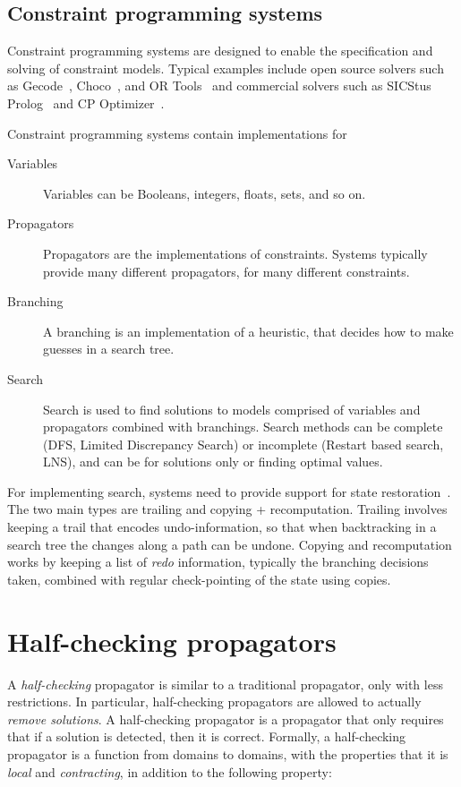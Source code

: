 \documentclass[runningheads]{llncs}
\begin{document}
\subsection{Constraint programming systems}
\label{sec:cp:systems}

Constraint programming systems are designed to enable the
specification and solving of constraint models.  Typical examples
include open source solvers such as Gecode~\cite{gecode},
Choco~\cite{choco}, and OR Tools~\cite{ortools} and commercial solvers
such as SICStus Prolog~\cite{sicstus} and CP
Optimizer~\cite{cpoptimizer}.

Constraint programming systems contain implementations for
\begin{description}
\item[Variables] Variables can be Booleans, integers, floats, sets,
  and so on. 
\item[Propagators] Propagators are the implementations of
  constraints. Systems typically provide many different propagators,
  for many different constraints.
\item[Branching] A branching is an implementation of a heuristic, that
  decides how to make guesses in a search tree. 
\item[Search] Search is used to find solutions to models comprised of
  variables and propagators combined with branchings. Search methods
  can be complete (DFS, Limited Discrepancy Search) or incomplete
  (Restart based search, LNS), and can be for solutions only or
  finding optimal values.
\end{description}

For implementing search, systems need to provide support for state
restoration~\cite{Reischuk09}. The two main types are trailing and
copying + recomputation. Trailing involves keeping a trail that
encodes undo-information, so that when backtracking in a search tree the
changes along a path can be undone. Copying and recomputation works by
keeping a list of \emph{redo} information, typically the branching
decisions taken, combined with regular check-pointing of the state
using copies.

\section{Half-checking propagators}
\label{sec:hf-propagators}

A \emph{half-checking} propagator is similar to a traditional
propagator, only with less restrictions. In particular, half-checking
propagators are allowed to actually \emph{remove solutions}.  A
half-checking propagator is a propagator that only requires that if a
solution is detected, then it is correct. Formally, a half-checking
propagator is a function from domains to domains, with the properties
that it is \emph{local} and \emph{contracting}, in addition to the
following property:
\end{document}
